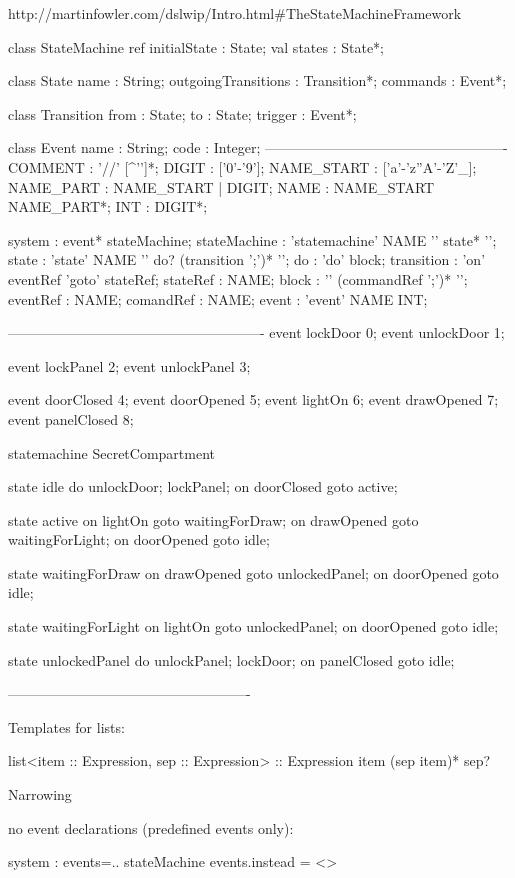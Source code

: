 http://martinfowler.com/dslwip/Intro.html#TheStateMachineFramework

class StateMachine {
	ref initialState : State;	
	val states : State*;
}

class State {
	name : String;
	outgoingTransitions : Transition*;
	commands : Event*;
}

class Transition {
	from : State;
	to : State;
	trigger : Event*;
}

class Event {
	name : String;
	code : Integer;
}
----------------------------------------------------
COMMENT : '//' [^'\n']*;
DIGIT : ['0'-'9'];
NAME_START : ['a'-'z''A'-'Z'_];
NAME_PART : NAME_START | DIGIT;
NAME : NAME_START NAME_PART*;
INT : DIGIT*;

system : event* stateMachine;
stateMachine : 'statemachine' NAME '{' state* '}';
state : 'state' NAME '{' do? (transition ';')* '}';
do : 'do' block;
transition : 'on' eventRef 'goto' stateRef;
stateRef : NAME;
block : '{' (commandRef ';')* '}';
eventRef : NAME;
comandRef : NAME;
event : 'event' NAME INT;

-------------------------------------------------------
event lockDoor 0;
event unlockDoor 1;

event lockPanel 2;
event unlockPanel 3;

event doorClosed 4;
event doorOpened 5;
event lightOn 6;
event drawOpened 7;
event panelClosed 8;

statemachine SecretCompartment {
	state idle {
		do {
			unlockDoor;
			lockPanel;
		}
		on doorClosed goto active;
	}
	
	state active {
		on lightOn goto waitingForDraw;
		on drawOpened goto waitingForLight;
		on doorOpened goto idle;
	}
	
	state waitingForDraw {
		on drawOpened goto unlockedPanel;
		on doorOpened goto idle;
	}
	
	state waitingForLight {
		on lightOn goto unlockedPanel;
		on doorOpened goto idle;
	}
	
	state unlockedPanel {
		do {
			unlockPanel;
			lockDoor;
		}
		on panelClosed goto idle;
	}
}
----------------------------------------------------

Templates for lists:

	list<item :: Expression, sep :: Expression> :: Expression {
		item (sep item)* sep?
	}

Narrowing

no event declarations (predefined events only):

	system : events=.. stateMachine
		events.instead = <>
	
